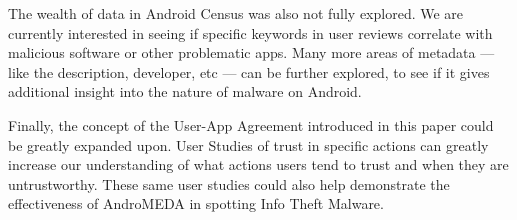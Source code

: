 The wealth of data in Android Census was also not fully explored. We are currently interested in seeing if specific keywords in user reviews correlate with malicious software or other problematic apps. Many more areas of metadata --- like the description, developer, etc --- can be further explored, to see if it gives additional insight into the nature of malware on Android.

Finally, the concept of the User-App Agreement introduced in this paper could be greatly expanded upon. User Studies of trust in specific actions can greatly increase our understanding of what actions users tend to trust and when they are untrustworthy. These same user studies could also help demonstrate the effectiveness of AndroMEDA in spotting Info Theft Malware.